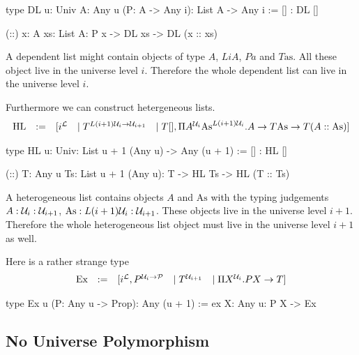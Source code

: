 \begin{alba}
    type DL {u: Univ} {A: Any u} (P: A -> Any i): List A -> Any i :=
        [] : DL []

        (::) {x: A} {xs: List A}: P x -> DL xs -> DL (x :: xs)
\end{alba}

A dependent list might contain objects of type $A$, $LiA$, $Pa$ and
$T\text{as}$. All these object live in the universe level $i$. Therefore the
whole dependent list can live in the universe level $i$.

Furthermore we can construct hetergeneous lists.
$$
\begin{array}{lllll}
    \text{HL} &:=&
    [
        i^{\mathcal L}
        &\mid
        T^{L(i+1){\mathcal U}_i \to {\mathcal U}_{i+1}}
        &\mid
        T[],
        \Pi A^{{\mathcal U}_i} \text{As}^{L(i+1){\mathcal U}_i}.
            A \to T\text{As} \to T(A :: \text{As})
    ]
\end{array}
$$

\begin{alba}
    type HL {u: Univ}: List {u + 1} (Any u) -> Any (u + 1) :=
        [] : HL []

        (::) {T: Any u} {Ts: List {u + 1} (Any u)}:
            T -> HL Ts -> HL (T :: Ts)
\end{alba}



A heterogeneous list contains objects $A$ and $\text{As}$ with the typing
judgements $A : {\mathcal U}_i : {\mathcal U}_{i+1}$, $\text{As}: L(i+1){\mathcal U}_i : {\mathcal U}_{i+1}$.
These objects live in the universe level $i+1$. Therefore the whole
heterogeneous list object must live in the universe level $i+1$ as well.


Here is a rather strange type
$$
\begin{array}{lllll}
    \text{Ex}
    &:=&
    [
        i^{\mathcal L},
        P^{{\mathcal U}_i \to {\mathcal P}}
        &\mid
        T^{{\mathcal U}_{i+1}}
        &\mid
        \Pi X^{{\mathcal U}_i}. P X \to T
    ]
\end{array}
$$

\begin{alba}
    type Ex {u} (P: Any u -> Prop): Any (u + 1) :=
        ex {X: Any u}: P X -> Ex
\end{alba}




\subsection{No Universe Polymorphism}

